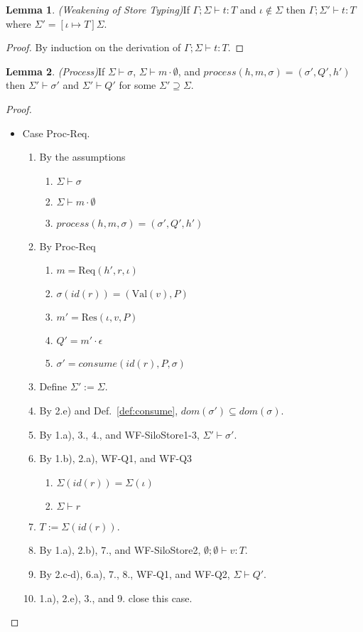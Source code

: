 \documentclass{article}
\theoremstyle{definition}
\newtheorem{lem}{Lemma}[section]
\newcommand{\Req}[3]{\text{Req}(#1, #2, #3)}
\newcommand{\ResP}[3]{\text{Res}(#1, #2, #3)}
\newcommand{\Val}[1]{\text{Val}(#1)}
\begin{document}
\begin{lem}
\emph{(Weakening of Store Typing)}\label{lem:weakening-store-typing}
If $\Gamma ; \Sigma \vdash t : T$ and $\iota \notin \Sigma$ then $\Gamma ; \Sigma' \vdash t : T$ where $\Sigma' = [\iota \mapsto T]\Sigma$.
\end{lem}
\begin{proof}
By induction on the derivation of $\Gamma ; \Sigma \vdash t : T$.
\end{proof}

\begin{lem}\emph{(Process)}\label{lem:process}
If $\Sigma \vdash \sigma$, $\Sigma \vdash m \cdot \emptyset$, and $process(h, m, \sigma) = (\sigma', Q', h')$ then $\Sigma' \vdash \sigma'$ and $\Sigma' \vdash Q'$ for some $\Sigma' \supseteq \Sigma$.
\end{lem}
\begin{proof}
\begin{itemize}
\item Case Proc-Req.
\begin{enumerate}
\item By the assumptions
  \begin{enumerate}[label=(\alph*)]
  \item $\Sigma \vdash \sigma$
  \item $\Sigma \vdash m \cdot \emptyset$
  \item $process(h, m, \sigma) = (\sigma', Q', h')$
  \end{enumerate}
\item By Proc-Req
  \begin{enumerate}[label=(\alph*)]
  \item $m = {\Req {h'} r \iota}$
  \item $\sigma(id(r)) = ({\Val v}, P)$
  \item $m' = {\ResP \iota v P}$
  \item $Q' = m' \cdot \epsilon$
  \item $\sigma' = consume(id(r), P, \sigma)$
  \end{enumerate}
\item Define $\Sigma' := \Sigma$.
\item By 2.e) and Def.~\ref{def:consume}, $dom(\sigma') \subseteq dom(\sigma)$.
\item By 1.a), 3., 4., and WF-SiloStore1-3, $\Sigma' \vdash \sigma'$.
\item By 1.b), 2.a), WF-Q1, and WF-Q3
  \begin{enumerate}[label=(\alph*)]
  \item $\Sigma(id(r)) = \Sigma(\iota)$
  \item $\Sigma \vdash r$
  \end{enumerate}
\item $T := \Sigma(id(r))$.
\item By 1.a), 2.b), 7., and WF-SiloStore2, $\emptyset ; \emptyset \vdash v : T$.
\item By 2.c-d), 6.a), 7., 8., WF-Q1, and WF-Q2, $\Sigma \vdash Q'$.
\item 1.a), 2.e), 3., and 9. close this case.
\end{enumerate}


\end{itemize}
\end{proof}
\end{document}
